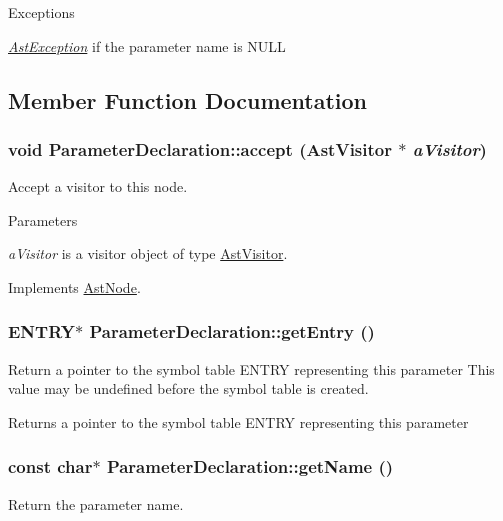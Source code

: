 \begin{DoxyExceptions}{Exceptions}
\item[{\em \hyperlink{classAstException}{AstException}}]if the parameter name is NULL \end{DoxyExceptions}


\subsection{Member Function Documentation}
\hypertarget{classParameterDeclaration_a7e9679286d169930445a159abd5e42ad}{
\subsubsection[{accept}]{\setlength{\rightskip}{0pt plus 5cm}void ParameterDeclaration::accept ({\bf AstVisitor} $\ast$ {\em aVisitor})}}
\label{classParameterDeclaration_a7e9679286d169930445a159abd5e42ad}
Accept a visitor to this node. 
\begin{DoxyParams}{Parameters}
\item[{\em aVisitor}]is a visitor object of type \hyperlink{classAstVisitor}{AstVisitor}. \end{DoxyParams}


Implements \hyperlink{classAstNode_a67b2d6ce1262da2954fb4db255759fb3}{AstNode}.\hypertarget{classParameterDeclaration_a80ec2ae28260deaa1925f3de51c620a8}{
\subsubsection[{getEntry}]{\setlength{\rightskip}{0pt plus 5cm}ENTRY$\ast$ ParameterDeclaration::getEntry ()}}
\label{classParameterDeclaration_a80ec2ae28260deaa1925f3de51c620a8}
Return a pointer to the symbol table ENTRY representing this parameter This value may be undefined before the symbol table is created.

\begin{DoxyReturn}{Returns}
a pointer to the symbol table ENTRY representing this parameter 
\end{DoxyReturn}
\hypertarget{classParameterDeclaration_ae8b4050a45ff9671d5bc4020ce8a921f}{
\subsubsection[{getName}]{\setlength{\rightskip}{0pt plus 5cm}const char$\ast$ ParameterDeclaration::getName ()}}
\label{classParameterDeclaration_ae8b4050a45ff9671d5bc4020ce8a921f}
Return the parameter name.

